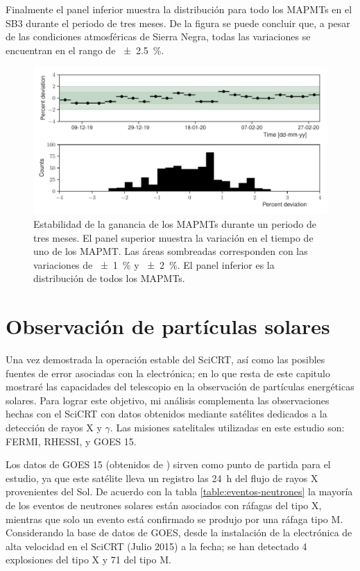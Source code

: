 Finalmente el panel inferior muestra la distribución para todo los MAPMTs en el SB3 durante el periodo de tres meses. De la figura se puede concluir que, a pesar de las condiciones atmosféricas de Sierra Negra, todas las variaciones se encuentran en el rango de \SI{\pm 2.5}{\percent}.

\begin{figure}
        \centering
        \includegraphics[width=\textwidth]{neutron-mip_stability.pdf}
        \caption{Estabilidad de la ganancia de los MAPMTs durante un periodo de tres meses. El panel superior muestra la variación en el tiempo de uno de los MAPMT. Las áreas sombreadas corresponden con las variaciones de \SI{\pm 1}{\percent} y \SI{\pm 2}{\percent}. El panel inferior es la distribución de todos los MAPMTs.}
        \label{fig:mip-stability}
\end{figure}

\section{Observación de partículas solares}

Una vez demostrada la operación estable del SciCRT, así como las posibles fuentes de error asociadas con la electrónica; en lo que resta de este capitulo mostraré las capacidades del telescopio en la observación de partículas energéticas solares. Para lograr este objetivo, mi análisis complementa las observaciones hechas con el SciCRT con datos obtenidos mediante satélites dedicados a la detección de rayos X y $\gamma$. Las misiones satelitales utilizadas en este estudio son: FERMI, RHESSI, y GOES \num{15}.

Los datos de GOES \num{15} (obtenidos de \cite{goesdata}) sirven como punto de partida para el estudio, ya que este satélite lleva un registro las \SI{24}{\hour} del flujo de rayos X provenientes del Sol. De acuerdo con la tabla \ref{table:eventos-neutrones} la mayoría de los eventos de neutrones solares están asociados con ráfagas del tipo X, mientras que solo un evento está confirmado se produjo por una ráfaga tipo M. Considerando la base de datos de GOES, desde la instalación de la electrónica de alta velocidad en el SciCRT (Julio \num{2015}) a la fecha; se han detectado \num{4} explosiones del tipo X y \num{71} del tipo M.

